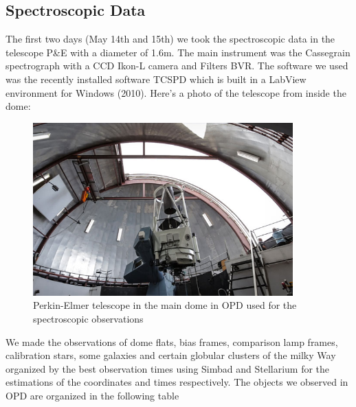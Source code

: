 \subsection{Spectroscopic Data}

The first two days (May 14th and 15th) we took the spectroscopic data in the telescope P\&E with a diameter of 1.6m. The main instrument was the Cassegrain spectrograph with a CCD Ikon-L camera and Filters BVR. The software we used was the recently installed software TCSPD which is built in a LabView environment for Windows (2010). Here's a photo of the telescope from inside the dome:

\begin{figure}[H]
\centering
\includegraphics[width=10cm]{images/opd-spectrograph.jpg}
\caption[Perkin-Elmer telescope used for Spectroscopy]{Perkin-Elmer telescope in the main dome in OPD used for the spectroscopic observations}
\end{figure}

We made the observations of dome flats, bias frames, comparison lamp frames, calibration stars, some galaxies and certain globular clusters of the milky Way organized by the best observation times using Simbad and Stellarium for the estimations of the coordinates and times respectively. The objects we observed in OPD are organized in the following table

